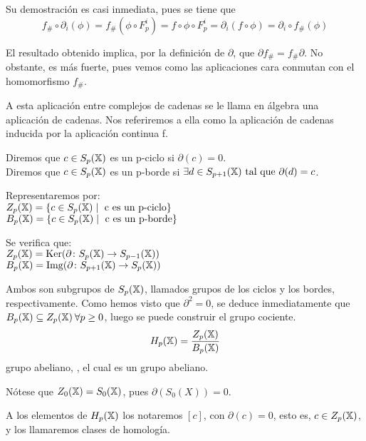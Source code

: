 Su demostración es casi inmediata, pues se tiene que \[ f_\# \circ \partial_i(\phi) = f_\#(\phi \circ F_p^i) = f \circ \phi \circ F_p^i
                                             = \partial_i(f \circ \phi) = \partial_i \circ f_\#(\phi) \]

El resultado obtenido implica, por la definición de $\partial$, que $\partial f_\# = f_\# \partial$. No obstante, es más fuerte, pues vemos
como las aplicaciones cara conmutan con el homomorfismo $f_\#$.

A esta aplicación entre complejos de cadenas se le llama en álgebra una aplicación de cadenas. Nos referiremos a ella como la aplicación de cadenas
inducida por la aplicación continua f.

\begin{definition}
  Diremos que $c \in S_p({\mathbb X})$ es un p-ciclo si $\partial(c) = 0$. \\
  Diremos que $c \in S_p({\mathbb X})$ es un p-borde si $\exists d \in S_{p+1}({\mathbb X}) \text{ tal que } \partial(d) = c$.
\end{definition}


Representaremos por: \\
$Z_p({\mathbb X}) = \{c \in S_p({\mathbb X}) \mid \text{ c es un p-ciclo}\}$ \\
$B_p({\mathbb X}) = \{c \in S_p({\mathbb X}) \mid \text{ c es un p-borde}\} $

Se verifica que: \\
$Z_p({\mathbb X}) = \operatorname{Ker} (\partial \colon S_p({\mathbb X}) \to S_{p-1}({\mathbb X})) $ \\
$B_p({\mathbb X}) = \operatorname{Img} (\partial \colon S_{p+1}({\mathbb X}) \to S_p({\mathbb X})) $

Ambos son subgrupos de $S_p({\mathbb X})$, llamados grupos de los ciclos y los bordes, respectivamente. Como hemos visto que $\partial^2 = 0$, se deduce
inmediatamente que $B_p({\mathbb X}) \subseteq Z_p({\mathbb X}) \hspace{0.2em}\forall p \geq 0$, luego se puede construir el grupo cociente.
\begin{equation*}
  H_p({\mathbb X}) = \frac{\displaystyle Z_p({\mathbb X})}{\displaystyle B_p({\mathbb X})}
\end{equation*}
grupo abeliano, \underline{}, el cual es un grupo abeliano.

\begin{remark}
  Nótese que $Z_0({\mathbb X}) = S_0({\mathbb X})$, pues $\partial(S_0(X)) = 0$.
\end{remark}

A los elementos de $H_p({\mathbb X})$ los notaremos $[c]$, con $\partial(c) = 0$, esto es, $c \in Z_p({\mathbb X})$, y los llamaremos clases de homología.

